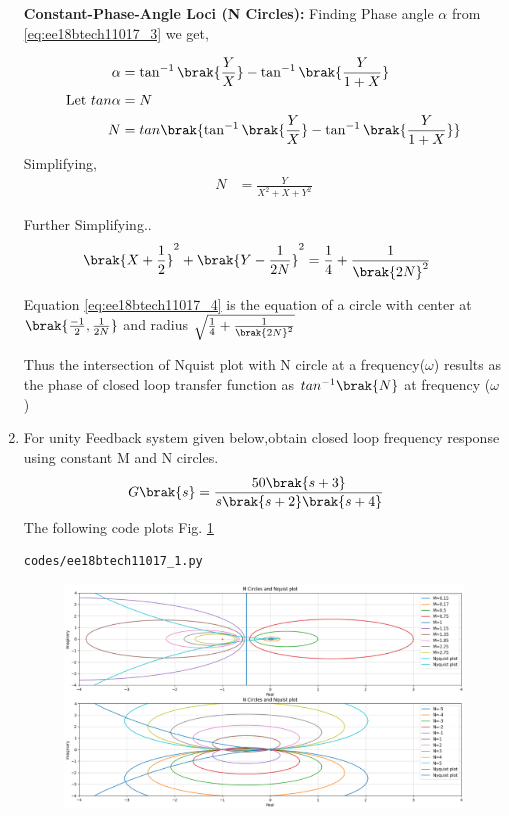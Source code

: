 \begin{enumerate}[label=\thesection.\arabic*.,ref=\thesection.\theenumi]
\textbf{Constant-Phase-Angle Loci (N Circles):}
Finding Phase angle $\alpha$ from \eqref{eq:ee18btech11017_3} we get,

\begin{align}
\alpha &= \tan^{-1}\brak{\frac{Y}{X}}-\tan^{-1}\brak{\frac{Y}{1+X}}
\\
\text{Let } tan\alpha &= N
\\
N &= tan\brak{\tan^{-1}\brak{\frac{Y}{X}}-\tan^{-1}\brak{\frac{Y}{1+X}}}
\end{align}
Simplifying,
\begin{align}
N &= \frac{Y}{X^{2}+X+Y^{2}}
\end{align}

Further Simplifying..
\begin{align}
\brak{X+\frac{1}{2}}^{2}+\brak{Y-\frac{1}{2N}}^{2} &= \frac{1}{4}+\frac{1}{\brak{2N}^{2}}
\label{eq:ee18btech11017_4}
\end{align}

Equation \eqref{eq:ee18btech11017_4} is the equation of a circle with center at $\brak{\frac{-1}{2},\frac{1}{2N}}$ and radius $\sqrt{\frac{1}{4}+\frac{1}{\brak{2N}^{2}}}$


Thus the intersection of Nquist plot with N circle at a frequency($\omega$) results as the phase of closed loop transfer function as $tan^{-1}\brak{N}$ at frequency ($\omega$)


\item
For unity Feedback system given below,obtain closed loop frequency response using constant M and N circles.
\begin{align}
G\brak{s} &=\frac{50\brak{s+3}}{s\brak{s+2}\brak{s+4}}
\end{align}
\solution
The following code plots Fig. \ref{fig:ee18btech11017}
\begin{lstlisting}
codes/ee18btech11017_1.py
\end{lstlisting}


\begin{figure}[!h]
  \includegraphics[width=\columnwidth]{./figs/ee18btech11017_fig1.eps}
 \caption{}
  \label{fig:ee18btech11017}
\end{figure}


\end{enumerate}
